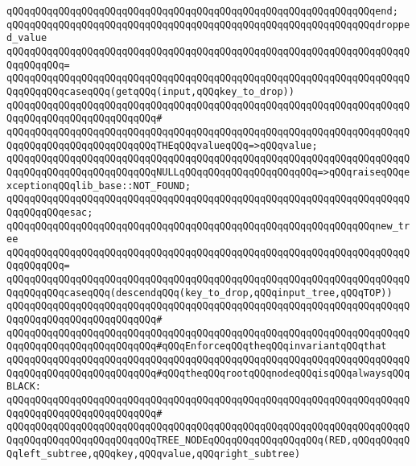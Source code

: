 \verb|qQQqqQQqqQQqqQQqqQQqqQQqqQQqqQQqqQQqqQQqqQQqqQQqqQQqqQQqqQQqqQQqend;|\newline
\newline
\verb|qQQqqQQqqQQqqQQqqQQqqQQqqQQqqQQqqQQqqQQqqQQqqQQqqQQqqQQqqQQqqQQqdropped_value|\newline
\verb|qQQqqQQqqQQqqQQqqQQqqQQqqQQqqQQqqQQqqQQqqQQqqQQqqQQqqQQqqQQqqQQqqQQqqQQqqQQqqQQq=|\newline
\verb|qQQqqQQqqQQqqQQqqQQqqQQqqQQqqQQqqQQqqQQqqQQqqQQqqQQqqQQqqQQqqQQqqQQqqQQqqQQqqQQqcaseqQQq(getqQQq(input,qQQqkey_to_drop))|\newline
\verb|qQQqqQQqqQQqqQQqqQQqqQQqqQQqqQQqqQQqqQQqqQQqqQQqqQQqqQQqqQQqqQQqqQQqqQQqqQQqqQQqqQQqqQQqqQQqqQQq#|\newline
\verb|qQQqqQQqqQQqqQQqqQQqqQQqqQQqqQQqqQQqqQQqqQQqqQQqqQQqqQQqqQQqqQQqqQQqqQQqqQQqqQQqqQQqqQQqqQQqqQQqTHEqQQqvalueqQQq=>qQQqvalue;|\newline
\verb|qQQqqQQqqQQqqQQqqQQqqQQqqQQqqQQqqQQqqQQqqQQqqQQqqQQqqQQqqQQqqQQqqQQqqQQqqQQqqQQqqQQqqQQqqQQqqQQqNULLqQQqqQQqqQQqqQQqqQQqqQQq=>qQQqraiseqQQqexceptionqQQqlib_base::NOT_FOUND;|\newline
\verb|qQQqqQQqqQQqqQQqqQQqqQQqqQQqqQQqqQQqqQQqqQQqqQQqqQQqqQQqqQQqqQQqqQQqqQQqqQQqqQQqesac;|\newline
\newline
\verb|qQQqqQQqqQQqqQQqqQQqqQQqqQQqqQQqqQQqqQQqqQQqqQQqqQQqqQQqqQQqqQQqnew_tree|\newline
\verb|qQQqqQQqqQQqqQQqqQQqqQQqqQQqqQQqqQQqqQQqqQQqqQQqqQQqqQQqqQQqqQQqqQQqqQQqqQQqqQQq=|\newline
\verb|qQQqqQQqqQQqqQQqqQQqqQQqqQQqqQQqqQQqqQQqqQQqqQQqqQQqqQQqqQQqqQQqqQQqqQQqqQQqqQQqcaseqQQq(descendqQQq(key_to_drop,qQQqinput_tree,qQQqTOP))|\newline
\verb|qQQqqQQqqQQqqQQqqQQqqQQqqQQqqQQqqQQqqQQqqQQqqQQqqQQqqQQqqQQqqQQqqQQqqQQqqQQqqQQqqQQqqQQqqQQqqQQq#|\newline
\verb|qQQqqQQqqQQqqQQqqQQqqQQqqQQqqQQqqQQqqQQqqQQqqQQqqQQqqQQqqQQqqQQqqQQqqQQqqQQqqQQqqQQqqQQqqQQqqQQq#qQQqEnforceqQQqtheqQQqinvariantqQQqthat|\newline
\verb|qQQqqQQqqQQqqQQqqQQqqQQqqQQqqQQqqQQqqQQqqQQqqQQqqQQqqQQqqQQqqQQqqQQqqQQqqQQqqQQqqQQqqQQqqQQqqQQq#qQQqtheqQQqrootqQQqnodeqQQqisqQQqalwaysqQQqBLACK:|\newline
\verb|qQQqqQQqqQQqqQQqqQQqqQQqqQQqqQQqqQQqqQQqqQQqqQQqqQQqqQQqqQQqqQQqqQQqqQQqqQQqqQQqqQQqqQQqqQQqqQQq#|\newline
\verb|qQQqqQQqqQQqqQQqqQQqqQQqqQQqqQQqqQQqqQQqqQQqqQQqqQQqqQQqqQQqqQQqqQQqqQQqqQQqqQQqqQQqqQQqqQQqqQQqTREE_NODEqQQqqQQqqQQqqQQqqQQq(RED,qQQqqQQqqQQqleft_subtree,qQQqkey,qQQqvalue,qQQqright_subtree)|\newline
